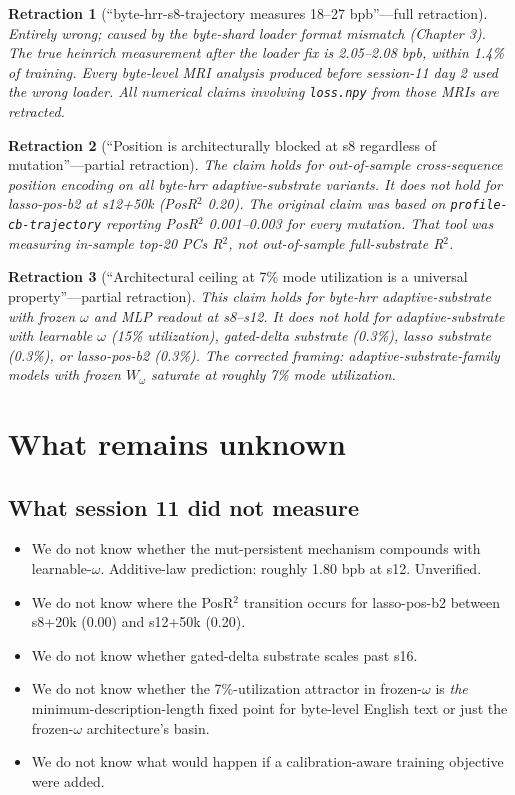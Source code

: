 \documentclass[11pt,openany]{book}
\newtheorem{retraction}{Retraction}[chapter]
\begin{document}
\begin{retraction}[``byte-hrr-s8-trajectory measures 18--27 bpb''---full
retraction]
Entirely wrong; caused by the byte-shard loader format mismatch
(Chapter 3). The true heinrich measurement after the loader fix is
2.05--2.08 bpb, within 1.4\% of training. Every byte-level MRI
analysis produced before session-11 day 2 used the wrong loader. All
numerical claims involving \texttt{loss.npy} from those MRIs are
retracted.
\end{retraction}

\begin{retraction}[``Position is architecturally blocked at s8 regardless
of mutation''---partial retraction]
The claim holds for out-of-sample cross-sequence position encoding
on all byte-hrr adaptive-substrate variants. It does not hold for
lasso-pos-b2 at s12+50k (PosR$^2$ 0.20). The original claim was based
on \texttt{profile-cb-trajectory} reporting PosR$^2$ 0.001--0.003 for
every mutation. That tool was measuring in-sample top-20 PCs R$^2$,
not out-of-sample full-substrate R$^2$.
\end{retraction}

\begin{retraction}[``Architectural ceiling at 7\% mode utilization is
a universal property''---partial retraction]
This claim holds for byte-hrr adaptive-substrate with frozen $\omega$
and MLP readout at s8--s12. It does not hold for adaptive-substrate
with learnable $\omega$ (15\% utilization), gated-delta substrate
(0.3\%), lasso substrate (0.3\%), or lasso-pos-b2 (0.3\%). The
corrected framing: adaptive-substrate-family models with frozen
$W_\omega$ saturate at roughly 7\% mode utilization.
\end{retraction}

\chapter{What remains unknown}

\section{What session 11 did not measure}

\begin{itemize}
  \item We do not know whether the mut-persistent mechanism compounds
  with learnable-$\omega$. Additive-law prediction: roughly 1.80 bpb
  at s12. Unverified.
  \item We do not know where the PosR$^2$ transition occurs for
  lasso-pos-b2 between s8+20k (0.00) and s12+50k (0.20).
  \item We do not know whether gated-delta substrate scales past s16.
  \item We do not know whether the 7\%-utilization attractor in
  frozen-$\omega$ is \emph{the} minimum-description-length fixed
  point for byte-level English text or just the frozen-$\omega$
  architecture's basin.
  \item We do not know what would happen if a calibration-aware
  training objective were added.
\end{itemize}
\end{document}
